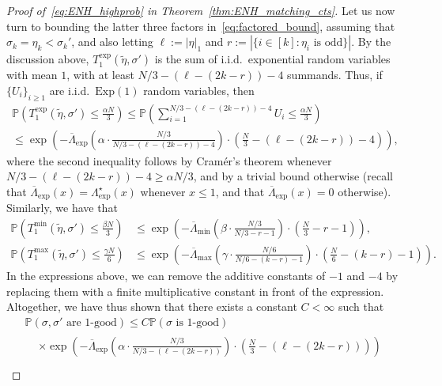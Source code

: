 \documentclass[11pt]{article}
\numberwithin{equation}{section}
\newcommand{\p}{\mathbb{P}} %
\newcommand{\Exp}{\mathrm{Exp}} %
\newcommand{\wt}{\widetilde} %
\theoremstyle{definition}
\begin{document}
\begin{proof}[Proof of~\eqref{eq:ENH_highprob} in Theorem~\ref{thm:ENH_matching_cts}]
Let us now turn to bounding the latter three factors in~\eqref{eq:factored_bound}, 
assuming that $\sigma_{k} = \eta_{k} < \sigma_{k}'$, 
and also letting 
$\ell := | \eta |_{1}$ 
and 
$r := |\{ i \in [k] : \eta_{i} \text{ is odd}\}|$. 
By the discussion above, 
$T_{1}^{\exp} \left( \wt{\eta}, \sigma' \right)$
is the sum of i.i.d.\ exponential random variables with mean $1$, 
with at least $N/3 - (\ell - (2k - r)) - 4$ summands. 
Thus, if $\{ U_{i} \}_{i \geq 1}$ are i.i.d.\ $\Exp(1)$ random variables, then 
\begin{multline*}
\p \left( T_{1}^{\exp} \left( \wt{\eta}, \sigma' \right) \leq \frac{\alpha N}{3} \right) 
\leq 
\p \left( \sum_{i=1}^{N/3 - (\ell - (2k - r)) - 4} U_{i} \leq \frac{\alpha N}{3} \right) \\
\leq 
\exp \left( - \overline{\Lambda}_{\exp} \left(  \alpha \cdot \frac{N/3}{N/3 - (\ell - (2k - r)) - 4} \right) \cdot \left( \frac{N}{3} - (\ell - (2k - r)) - 4 \right) \right),
\end{multline*}
where the second inequality follows by Cram\'er's theorem 
whenever 
$N/3 - (\ell - (2k - r)) - 4 
\geq \alpha N/3$, 
and by a trivial bound otherwise 
(recall that $\overline{\Lambda}_{\exp}(x) = \Lambda_{\exp}^{\star}(x)$ whenever $x \leq 1$, 
and that $\overline{\Lambda}_{\exp}(x) = 0$ otherwise). 
Similarly, we have that 
\begin{align*}
\p \left( T_{1}^{\min} \left( \wt{\eta}, \sigma' \right) \leq \frac{\beta N}{3} \right) 
&\leq 
\exp \left( - \overline{\Lambda}_{\min} \left( \beta \cdot \frac{N/3}{N/3 - r - 1} \right) \cdot \left( \frac{N}{3} - r - 1 \right) \right), \\
\p \left( T_{1}^{\max} \left( \wt{\eta}, \sigma' \right) \leq \frac{\gamma N}{6} \right) 
&\leq \exp \left( - \overline{\Lambda}_{\max} \left( \gamma \cdot \frac{N/6}{N/6 - (k-r) - 1} \right) \cdot \left( \frac{N}{6} - (k-r) - 1 \right) \right).
\end{align*}
In the expressions above, we can remove the additive constants of $-1$ and $-4$ by replacing them with a finite multiplicative constant in front of the expression. 
Altogether, we have thus shown that there exists a constant $C < \infty$ such that 
\begin{multline}
\p \left( \sigma, \sigma' \text{ are 1-good} \right) 
\leq C \p \left( \sigma \text{ is 1-good} \right) \\
\begin{aligned}
&\times \exp \left( - \overline{\Lambda}_{\exp} \left(  \alpha \cdot \frac{N/3}{N/3 - (\ell - (2k - r))} \right) \cdot \left( \frac{N}{3} - (\ell - (2k - r)) \right) \right) \\

\end{aligned}
\end{multline}
\end{proof}
\end{document}
